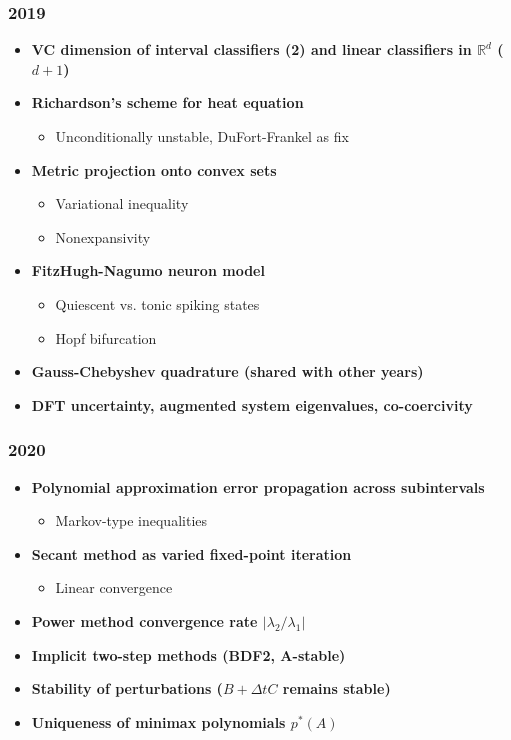 \subsubsection*{2019}
\begin{itemize}
    \item \textbf{VC dimension of interval classifiers (2) and linear classifiers in $\mathbb{R}^d$ ($d+1$)}
    \item \textbf{Richardson's scheme for heat equation}
        \begin{itemize}
            \item Unconditionally unstable, DuFort-Frankel as fix
        \end{itemize}
    \item \textbf{Metric projection onto convex sets}
        \begin{itemize}
            \item Variational inequality
            \item Nonexpansivity
        \end{itemize}
    \item \textbf{FitzHugh-Nagumo neuron model}
        \begin{itemize}
            \item Quiescent vs. tonic spiking states
            \item Hopf bifurcation
        \end{itemize}
    \item \textbf{Gauss-Chebyshev quadrature (shared with other years)}
    \item \textbf{DFT uncertainty, augmented system eigenvalues, co-coercivity}
\end{itemize}

\subsubsection*{2020}
\begin{itemize}
    \item \textbf{Polynomial approximation error propagation across subintervals}
        \begin{itemize}
            \item Markov-type inequalities
        \end{itemize}
    \item \textbf{Secant method as varied fixed-point iteration}
        \begin{itemize}
            \item Linear convergence
        \end{itemize}
    \item \textbf{Power method convergence rate $|\lambda_2/\lambda_1|$}
    \item \textbf{Implicit two-step methods (BDF2, A-stable)}
    \item \textbf{Stability of perturbations ($B + \Delta t C$ remains stable)}
    \item \textbf{Uniqueness of minimax polynomials $p^*(A)$}
\end{itemize}

